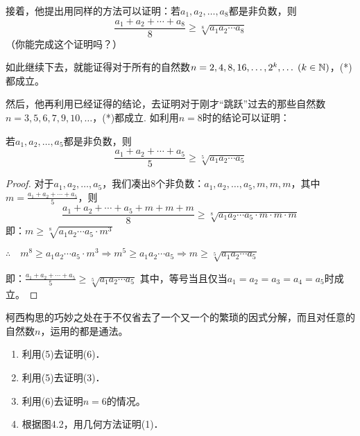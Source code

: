 接着，他提出用同样的方法可以证明：若$a_1,a_2,\ldots,a_8$都是非负数，则
\[\frac{a_1+a_2+\cdots+a_8}{8}\ge \sqrt[8]{a_1a_2\cdots a_8}\]
（你能完成这个证明吗？）

如此继续下去，就能证得对于所有的自然数$n=2,4,8,16,\ldots, 2^k,\ldots \; (k \in\mathbb{N})$，(*)都成立。

然后，他再利用已经证得的结论，去证明对于刚才“跳跃”过去的那些自然数$n=3,5,6,7,9,10,\ldots$，(*)都成立. 如利用$n=8$时的结论可以证明：

若$a_1,a_2,\ldots,a_5$都是非负数，则
\[\frac{a_1+a_2+\cdots+a_5}{5}\ge \sqrt[5]{a_1 a_2 \cdots a_5}\]

\begin{proof}
对于$a_1,a_2,\ldots,a_5$，我们凑出8个非负数：$a_1,a_2,\ldots,a_5,m,m,m$，其中$m=\frac{a_1+a_2+\cdots+a_5}{5}$，则
\[\frac{a_1+a_2+\cdots+a_5+m+m+m}{8}\ge \sqrt[8]{a_1 a_2 \cdots a_5\cdot m\cdot m\cdot m}\]
即：$m\ge \sqrt[8]{a_1a_2\cdots a_5\cdot m^3}$

$\therefore\quad m^8\ge a_1a_2\cdots a_5\cdot m^3 \Longrightarrow m^5\ge a_1a_2\cdots a_5\Longrightarrow m\ge \sqrt[5]{a_1a_2\cdots a_5}$

即：$\frac{a_1+a_2+\cdots +a_5}{5}\ge \sqrt[5]{a_1a_2\cdots a_5}$
其中，等号当且仅当$a_1=a_2=a_3=a_4=a_5$时成立。
\end{proof}

\begin{rmk}
    柯西构思的巧妙之处在于不仅省去了一个又一个的繁琐的因式分解，而且对任意的自然数$n$，运用的都是通法。
\end{rmk}

\begin{ex}
\begin{enumerate}
    \item 利用(5)去证明(6)．
    \item 利用(5)去证明(3)．
    \item 利用(6)去证明$n=6$的情况。
    \item 根据图4.2，用几何方法证明(1)．
\end{enumerate}        
\end{ex}

\begin{figure}[htp]
    \centering
{}
    \caption{}
\end{figure}

